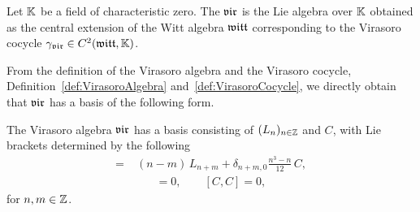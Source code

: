 \begin{definition}
  \label{def:VirasoroAlgebra}
  \leanok
  Let $\mathbb{K}$ be a field of characteristic zero.
  The  $\mathfrak{vir}$ is the Lie algebra over $\mathbb{K}$
  obtained as the central extension of the Witt algebra $\mathfrak{witt}$
  corresponding to the Virasoro cocycle ${\gamma}_{\mathfrak{vir}} \in C^2(\mathfrak{witt},\mathbb{K})$.
\end{definition}

From the definition of the Virasoro algebra and the Virasoro cocycle,
Definition~\ref{def:VirasoroAlgebra} and~\ref{def:VirasoroCocycle},
we directly obtain that $\mathfrak{vir}$ has a basis of the following form.

\begin{definition}
  \label{def:VirasoroBasis}
  \leanok
  The Virasoro algebra $\mathfrak{vir}$ has a basis consisting of $(L_n)_{n \in \mathbb{Z}}$
  and $C$, with Lie brackets determined by the following
  \begin{align*}
    [L_n, L_m] = \; & (n-m) \, L_{n+m} + \delta_{n+m,0} \frac{n^3 - n}{12} \, C ,
  \end{align*}
  \begin{align*}
    [C, L_n] = 0 , \qquad
    [C, C] = 0 ,
  \end{align*}
  for $n,m \in \mathbb{Z}$.
\end{definition}
